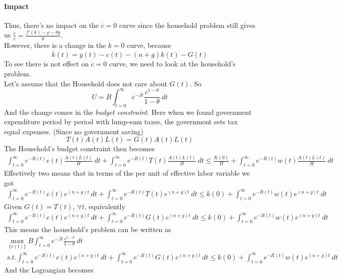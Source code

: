 \documentclass[]{article}
\begin{document}
			\paragraph{Impact}Thus, there's no impact on the $\dot{c} = 0$ curve since the household problem still gives us $\frac{\dot{c}}{c} = \frac{f'(k)-\rho-\theta g}{\theta}$. \\
			However, there is a change in the $\dot{k}=0$ curve, because 
			\[
				\dot{k}(t) = y(t) - c(t) - (n+g)k(t) - G(t)
			\]
			To see there is not effect on $\dot{c}=0$ curve, we need to look at the household's problem. \\
			Let's assume that the Household does not care about $G(t)$. So
			\[
				U = B\int_{t=0}^\infty e^{-\beta t} \frac{c^{1-\theta}}{1-\theta}\ dt
			\]
			And the change comes in the \emph{budget constraint}. Here when we found government expenditure period by period with lump-sum taxes, the government sets tax equal expenses. (Since no government saving)
			\[
				T(t)A(t)L(t) = G(t)A(t)L(t)
			\]
			The Household's budget constraint then becomes 
			\begin{gather*}
				\int_{t=0}^\infty e^{-R(t)} c(t)\frac{A(t)L(t)}{H}\ dt + \int_{t=0}^\infty e^{-R(t)} T(t) \frac{A(t)L(t)}{H}\ dt \leq \frac{K(0)}{H} + \int_{t=0}^\infty e^{-R(t)} w(t) \frac{A(t)L(t)}{H}\ dt
			\end{gather*}
			Effectively two means that in terms of the per unit of effective labor variable we got 
			\begin{gather*}
				\int_{t=0}^\infty e^{-R(t)} c(t) e^{(n+g)t}\ dt + \int_{t=0}^\infty e^{-R(t)} T(t) e^{(n+g)t}\ dt \leq k(0) + \int_{t=0}^\infty e^{-R(t)} w(t) e^{(n+g)t} \ dt
			\end{gather*}
			Given $G(t) = T(t),\ \forall t$, equivalently
			\begin{gather*}
				\int_{t=0}^\infty e^{-R(t)} c(t) e^{(n+g)t}\ dt + \int_{t=0}^\infty e^{-R(t)} G(t) e^{(n+g)t}\ dt \leq k(0) + \int_{t=0}^\infty e^{-R(t)} w(t) e^{(n+g)t} \ dt
			\end{gather*}
			This means the household's problem can be written as 
			\begin{gather*}
				\max_{\{c(t)\}} B\int_{t=0}^\infty e^{-\beta t} \frac{c^{1-\theta}}{1-\theta}\ dt \\
				s.t. \int_{t=0}^\infty e^{-R(t)} c(t) e^{(n+g)t}\ dt + \int_{t=0}^\infty e^{-R(t)} G(t) e^{(n+g)t}\ dt \leq k(0) + \int_{t=0}^\infty e^{-R(t)} w(t) e^{(n+g)t} \ dt
			\end{gather*}
			And the Lagrangian becomes
\end{document}
